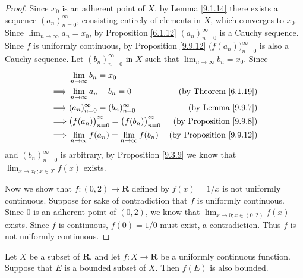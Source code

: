 \begin{proof}
    Since \(x_0\) is an adherent point of \(X\), by Lemma \ref{9.1.14} there exists a sequence \((a_n)_{n = 0}^\infty\), consisting entirely of elements in \(X\), which converges to \(x_0\).
    Since \(\lim_{n \to \infty} a_n = x_0\), by Proposition \ref{6.1.12} \((a_n)_{n = 0}^\infty\) is a Cauchy sequence.
    Since \(f\) is uniformly continuous, by Proposition \ref{9.9.12} \(\big(f(a_n)\big)_{n = 0}^\infty\) is also a Cauchy sequence.
    Let \((b_n)_{n = 0}^\infty\) in \(X\) such that \(\lim_{n \to \infty} b_n = x_0\).
    Since
    \begin{align*}
        & \lim_{n \to \infty} b_n = x_0 \\
        \implies & \lim_{n \to \infty} a_n - b_n = 0 & \text{(by Theorem \ref{6.1.19})} \\
        \implies & (a_n)_{n = 0}^\infty = (b_n)_{n = 0}^\infty & \text{(by Lemma \ref{9.9.7})} \\
        \implies & \big(f(a_n)\big)_{n = 0}^\infty = \big(f(b_n)\big)_{n = 0}^\infty & \text{(by Proposition \ref{9.9.8})} \\
        \implies & \lim_{n \to \infty} f(a_n) = \lim_{n \to \infty} f(b_n) & \text{(by Proposition \ref{9.9.12})}
    \end{align*}
    and \((b_n)_{n = 0}^\infty\) is arbitrary, by Proposition \ref{9.3.9} we know that \(\lim_{x \to x_0 ; x \in X} f(x)\) exists.

    Now we show that \(f : (0, 2) \to \mathbf{R}\) defined by \(f(x) = 1 / x\) is not uniformly continuous.
    Suppose for sake of contradiction that \(f\) is uniformly continuous.
    Since \(0\) is an adherent point of \((0, 2)\), we know that \(\lim_{x \to 0 ; x \in (0, 2)} f(x)\) exists.
    Since \(f\) is continuous, \(f(0) = 1 / 0\) must exist, a contradiction.
    Thus \(f\) is not uniformly continuous.
\end{proof}

\begin{proposition}\label{9.9.15}
    Let \(X\) be a subset of \(\mathbf{R}\), and let \(f : X \to \mathbf{R}\) be a uniformly continuous function.
    Suppose that \(E\) is a bounded subset of \(X\).
    Then \(f(E)\) is also bounded.
\end{proposition}

